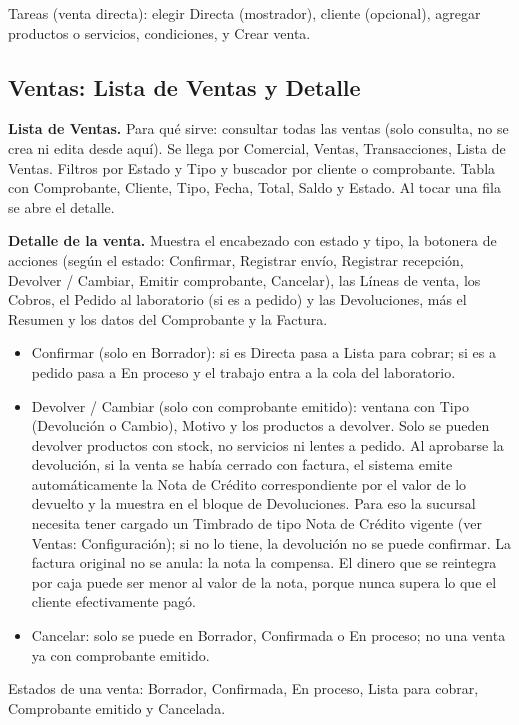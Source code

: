Tareas (venta directa): elegir Directa (mostrador), cliente (opcional), agregar productos o servicios, condiciones, y Crear venta.

\subsection{Ventas: Lista de Ventas y Detalle}
\label{sec:mu-ventas-lista}

\textbf{Lista de Ventas.} Para qué sirve: consultar todas las ventas (solo consulta, no se crea ni edita desde aquí). Se llega por Comercial, Ventas, Transacciones, Lista de Ventas. Filtros por Estado y Tipo y buscador por cliente o comprobante. Tabla con Comprobante, Cliente, Tipo, Fecha, Total, Saldo y Estado. Al tocar una fila se abre el detalle.

\textbf{Detalle de la venta.} Muestra el encabezado con estado y tipo, la botonera de acciones (según el estado: Confirmar, Registrar envío, Registrar recepción, Devolver / Cambiar, Emitir comprobante, Cancelar), las Líneas de venta, los Cobros, el Pedido al laboratorio (si es a pedido) y las Devoluciones, más el Resumen y los datos del Comprobante y la Factura.

\begin{itemize}
  \item Confirmar (solo en Borrador): si es Directa pasa a Lista para cobrar; si es a pedido pasa a En proceso y el trabajo entra a la cola del laboratorio.
  \item Devolver / Cambiar (solo con comprobante emitido): ventana con Tipo (Devolución o Cambio), Motivo y los productos a devolver. Solo se pueden devolver productos con stock, no servicios ni lentes a pedido. Al aprobarse la devolución, si la venta se había cerrado con factura, el sistema emite automáticamente la Nota de Crédito correspondiente por el valor de lo devuelto y la muestra en el bloque de Devoluciones. Para eso la sucursal necesita tener cargado un Timbrado de tipo Nota de Crédito vigente (ver Ventas: Configuración); si no lo tiene, la devolución no se puede confirmar. La factura original no se anula: la nota la compensa. El dinero que se reintegra por caja puede ser menor al valor de la nota, porque nunca supera lo que el cliente efectivamente pagó.
  \item Cancelar: solo se puede en Borrador, Confirmada o En proceso; no una venta ya con comprobante emitido.
\end{itemize}

Estados de una venta: Borrador, Confirmada, En proceso, Lista para cobrar, Comprobante emitido y Cancelada.

